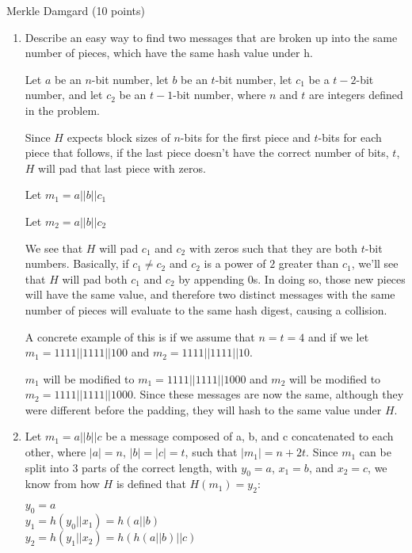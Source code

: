 \documentclass[12pt]{article}
\newenvironment{question}[2][Question]{\begin{trivlist}
\item[\hskip \labelsep {\bfseries #1}\hskip \labelsep {\bfseries #2.}]}{\end{trivlist}}
\begin{document}
\begin{question}{3}{Merkle Damgard (10 points)} %
\end{question}
 

\begin{enumerate}
    \item

    Describe an easy way to find two messages that are broken up into the same number of pieces, which
have the same hash value under h.

    Let  $a$ be an $n$-bit number, let $b$ be an $t$-bit number, let $c_1$ be a $t-2$-bit number, and let $c_2$ be an $t-1$-bit number, where $n$ and $t$ are integers defined in the problem. 

    Since $H$ expects block sizes of $n$-bits for the first piece and $t$-bits for each piece that follows, if the last piece doesn't have the correct number of bits, $t$, $H$ will pad that last piece with zeros.

    
    
    Let $m_1=a||b||c_1$

    Let $m_2=a||b||c_2$


    We see that $H$ will pad $c_1$ and $c_2$ with zeros such that they are both $t$-bit numbers. Basically, if $c_1 \not = c_2$ and $c_2$ is a power of $2$ greater than $c_1$, we'll see that $H$ will pad both $c_1$ and $c_2$ by appending $0$s. In doing so, those new pieces will have the same value, and therefore two distinct messages with the same number of pieces will evaluate to the same hash digest, causing a collision.

    A concrete example of this is if we assume that $n=t=4$ and if we let $m_1=1111||1111||100$ and $m_2=1111||1111||10$.

    $m_1$ will be modified to $m_1=1111||1111||1000$ and $m_2$ will be modified to $m_2=1111||1111||1000$. Since these messages are now the same, although they were different before the padding, they will hash to the same value under $H$.
    
    \item Let $m_1=a||b||c$ be a message composed of a, b, and c concatenated to each other, where $|a|=n$, $|b|=|c|=t$, such that $|m_1|=n+2t$. Since $m_1$ can be split into $3$ parts of the correct length, with $y_0=a$, $x_1=b$, and $x_2=c$, we know from how $H$ is defined that $H(m_1)=y_2$:

    $y_0=a$\\
    $y_1=h(y_0||x_1)=h(a||b)$\\
    $y_2=h(y_1||x_2)=h(h(a||b)||c)$
    

\end{enumerate}
\end{document}
